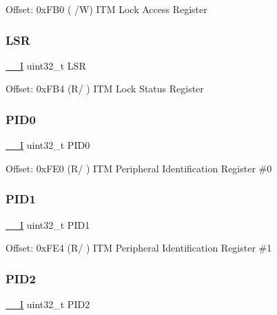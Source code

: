 Offset\+: 0x\+F\+B0 ( /W) I\+TM Lock Access Register \mbox{\label{struct_i_t_m___type_a8387dc0dc9f45c8a81cfc98bfff7ae32}} 
\subsubsection{\texorpdfstring{LSR}{LSR}}
{\footnotesize\ttfamily \mbox{\hyperlink{core__sc300_8h_af63697ed9952cc71e1225efe205f6cd3}{\+\_\+\+\_\+I}} uint32\+\_\+t L\+SR}

Offset\+: 0x\+F\+B4 (R/ ) I\+TM Lock Status Register \mbox{\label{struct_i_t_m___type_ad6c87ae4ca1aa56b4369a97fca639926}} 
\subsubsection{\texorpdfstring{PID0}{PID0}}
{\footnotesize\ttfamily \mbox{\hyperlink{core__sc300_8h_af63697ed9952cc71e1225efe205f6cd3}{\+\_\+\+\_\+I}} uint32\+\_\+t P\+I\+D0}

Offset\+: 0x\+F\+E0 (R/ ) I\+TM Peripheral Identification Register \#0 \mbox{\label{struct_i_t_m___type_ae554433b6f6c4733d222bcb2c75ccb39}} 
\subsubsection{\texorpdfstring{PID1}{PID1}}
{\footnotesize\ttfamily \mbox{\hyperlink{core__sc300_8h_af63697ed9952cc71e1225efe205f6cd3}{\+\_\+\+\_\+I}} uint32\+\_\+t P\+I\+D1}

Offset\+: 0x\+F\+E4 (R/ ) I\+TM Peripheral Identification Register \#1 \mbox{\label{struct_i_t_m___type_af07d9a44e0188d55742f5d6a8752cd2c}} 
\subsubsection{\texorpdfstring{PID2}{PID2}}
{\footnotesize\ttfamily \mbox{\hyperlink{core__sc300_8h_af63697ed9952cc71e1225efe205f6cd3}{\+\_\+\+\_\+I}} uint32\+\_\+t P\+I\+D2}

